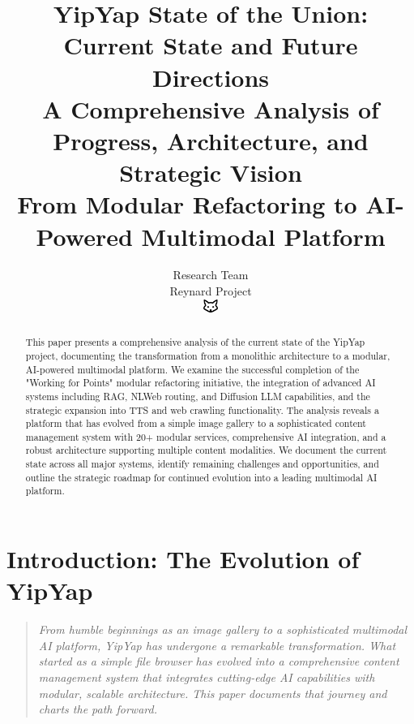 \documentclass[11pt]{article}
\begin{document}
\title{\textbf{YipYap State of the Union: Current State and Future Directions} \\
\Large{A Comprehensive Analysis of Progress, Architecture, and Strategic Vision} \\
\large{From Modular Refactoring to AI-Powered Multimodal Platform}}

\author{Research Team\\
Reynard Project\\
\includegraphics[width=0.5cm]{favicon.pdf}}

\maketitle

\begin{abstract}
This paper presents a comprehensive analysis of the current state of the YipYap project, documenting the transformation from a monolithic architecture to a modular, AI-powered multimodal platform. We examine the successful completion of the "Working for Points" modular refactoring initiative, the integration of advanced AI systems including RAG, NLWeb routing, and Diffusion LLM capabilities, and the strategic expansion into TTS and web crawling functionality. The analysis reveals a platform that has evolved from a simple image gallery to a sophisticated content management system with 20+ modular services, comprehensive AI integration, and a robust architecture supporting multiple content modalities. We document the current state across all major systems, identify remaining challenges and opportunities, and outline the strategic roadmap for continued evolution into a leading multimodal AI platform.
\end{abstract}

\tableofcontents
\newpage

\section{Introduction: The Evolution of YipYap}

\begin{quote}
\emph{From humble beginnings as an image gallery to a sophisticated multimodal AI platform, YipYap has undergone a remarkable transformation. What started as a simple file browser has evolved into a comprehensive content management system that integrates cutting-edge AI capabilities with modular, scalable architecture. This paper documents that journey and charts the path forward.}
\end{quote}
\end{document}
